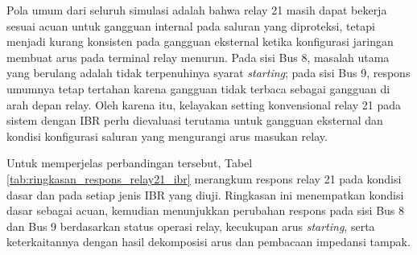 Pola umum dari seluruh simulasi adalah bahwa relay 21 masih dapat bekerja sesuai acuan untuk gangguan internal pada saluran yang diproteksi, tetapi menjadi kurang konsisten pada gangguan eksternal ketika konfigurasi jaringan membuat arus pada terminal relay menurun. Pada sisi Bus 8, masalah utama yang berulang adalah tidak terpenuhinya syarat \textit{starting}; pada sisi Bus 9, respons umumnya tetap tertahan karena gangguan tidak terbaca sebagai gangguan di arah depan relay. Oleh karena itu, kelayakan setting konvensional relay 21 pada sistem dengan IBR perlu dievaluasi terutama untuk gangguan eksternal dan kondisi konfigurasi saluran yang mengurangi arus masukan relay.

Untuk memperjelas perbandingan tersebut, Tabel \ref{tab:ringkasan_respons_relay21_ibr} merangkum respons relay 21 pada kondisi dasar dan pada setiap jenis IBR yang diuji. Ringkasan ini menempatkan kondisi dasar sebagai acuan, kemudian menunjukkan perubahan respons pada sisi Bus 8 dan Bus 9 berdasarkan status operasi relay, kecukupan arus \textit{starting}, serta keterkaitannya dengan hasil dekomposisi arus dan pembacaan impedansi tampak.

